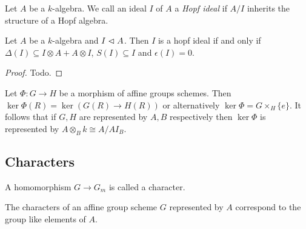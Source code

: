 \documentclass{memoir}
\begin{document}
\begin{definition}
    Let $A$ be a $k$-algebra. 
    We call an ideal $I$ of $A$ a \textit{Hopf ideal} if $A/I$ inherits the structure of a Hopf algebra.
\end{definition}
\begin{proposition}
    Let $A$ be a $k$-algebra and $I\vartriangleleft A$. Then $I$ is a hopf ideal if and only if $\Delta(I)\subseteq I\otimes A + A\otimes I$, $S(I)\subseteq I$ and $\epsilon(I) = 0$.
\end{proposition}
\begin{proof}
    Todo.
\end{proof}
\begin{definition}
    Let $\Phi:G\to H$ be a morphism of affine groups schemes. 
    Then $\ker\Phi (R) = \ker(G(R)\to H(R))$ or alternatively $\ker\Phi = G\times_H\{e\}$.
    It follows that if $G,H$ are represented by $A,B$ respectively then $\ker\Phi$ is represented by $A\otimes_B k\cong A/AI_B$.
\end{definition}
\subsection{Characters}
\begin{definition}
    A homomorphism $G\to G_m$ is called a character.
\end{definition}
\begin{thm}
    The characters of an affine group scheme $G$ represented by $A$ correspond to the group like elements of $A$.
\end{thm}
\end{document}

